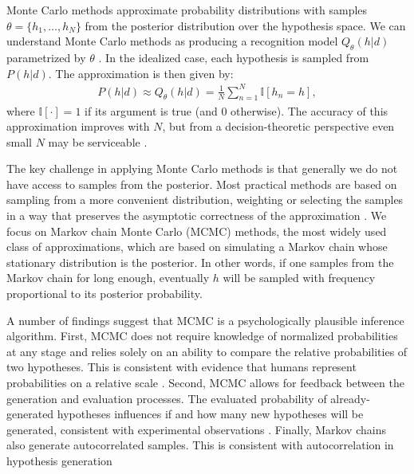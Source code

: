 Monte Carlo methods approximate probability distributions with samples $\theta = \{h_1,\ldots,h_N \}$ from the posterior distribution over the hypothesis space. We can understand Monte Carlo methods as producing a recognition model $Q_\theta(h|d)$ parametrized by $\theta$ \citep[see][for a systematic treatment]{saeedi17}. In the idealized case, each hypothesis is sampled from $P(h|d)$. The approximation is then given by:
\begin{align}
\textstyle
P(h|d) \approx Q_\theta(h|d) = \frac{1}{N}\sum_{n=1}^N \mathbb{I}[h_n=h],
\end{align}
where $\mathbb{I}[\cdot] = 1$ if its argument is true (and 0 otherwise). The accuracy of this approximation improves with $N$, but from a decision-theoretic perspective even small $N$ may be serviceable \citep{vul2014one,lieder2017anchoring,gershman2015computational}.

The key challenge in applying Monte Carlo methods is that generally we do not have access to samples from the posterior. Most practical methods are based on sampling from a more convenient distribution, weighting or selecting the samples in a way that preserves the asymptotic correctness of the approximation \citep{mackay2003information}. We focus on Markov chain Monte Carlo (MCMC) methods, the most widely used class of approximations, which are based on simulating a Markov chain whose stationary distribution is the posterior. In other words, if one samples from the Markov chain for long enough, eventually $h$ will be sampled with frequency proportional to its posterior probability.

A number of findings suggest that MCMC is a psychologically plausible inference algorithm. First, MCMC does not require knowledge of normalized probabilities at any stage and relies solely on an ability to compare the relative probabilities of two hypotheses. This is consistent with evidence that humans represent probabilities on a relative scale \citep{stewart06}. Second, MCMC allows for feedback between the generation and evaluation processes. The evaluated probability of already-generated hypotheses influences if and how many new hypotheses will be generated, consistent with experimental observations \citep{hamrick15}. Finally, Markov chains also generate autocorrelated samples. This is consistent with autocorrelation in hypothesis generation \citep{bonawitz14,gershman12,vul08,lieder2017anchoring}

